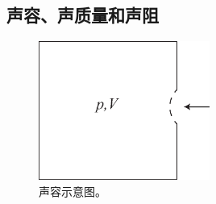 \subsection{声容、声质量和声阻}

\begin{figure}[h!]
  \centering
  \includegraphics[width=0.5\textwidth]{images/fig2-1.eps} 
  \caption{声容示意图。 }
  \label{fig_2_1}
\end{figure}

